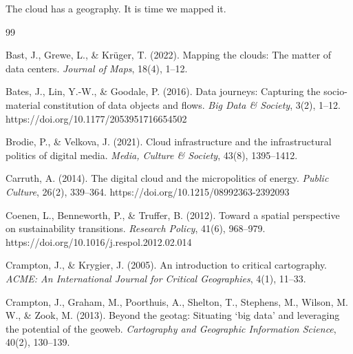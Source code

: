 \documentclass[review]{elsarticle}
\begin{document}
The cloud has a geography. It is time we mapped it.



%



\begin{thebibliography}{99}


Bast, J., Grewe, L., \& Krüger, T. (2022). Mapping the clouds: The matter of data centers. \textit{Journal of Maps}, 18(4), 1--12.

Bates, J., Lin, Y.-W., \& Goodale, P. (2016). Data journeys: Capturing the socio-material constitution of data objects and flows. \textit{Big Data \& Society}, 3(2), 1--12. https://doi.org/10.1177/2053951716654502

Brodie, P., \& Velkova, J. (2021). Cloud infrastructure and the infrastructural politics of digital media. \textit{Media, Culture \& Society}, 43(8), 1395--1412.

Carruth, A. (2014). The digital cloud and the micropolitics of energy. \textit{Public Culture}, 26(2), 339--364. https://doi.org/10.1215/08992363-2392093

Coenen, L., Benneworth, P., \& Truffer, B. (2012). Toward a spatial perspective on sustainability transitions. \textit{Research Policy}, 41(6), 968--979. https://doi.org/10.1016/j.respol.2012.02.014

Crampton, J., \& Krygier, J. (2005). An introduction to critical cartography. \textit{ACME: An International Journal for Critical Geographies}, 4(1), 11--33.

Crampton, J., Graham, M., Poorthuis, A., Shelton, T., Stephens, M., Wilson, M. W., \& Zook, M. (2013). Beyond the geotag: Situating `big data' and leveraging the potential of the geoweb. \textit{Cartography and Geographic Information Science}, 40(2), 130--139.


\end{thebibliography}
\end{document}
